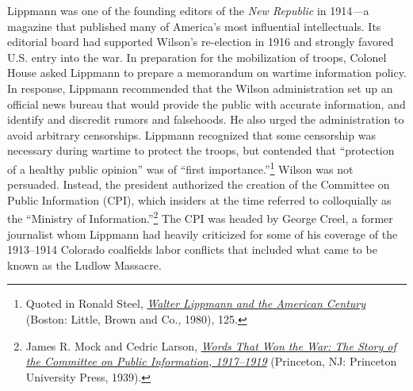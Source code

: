 \documentclass[openany,nobib,nohyper]{tufte-book}
\begin{document}
Lippmann was one of the founding editors of the \emph{New Republic} in
1914\emph{---}a magazine that published many of America's most
influential intellectuals. Its editorial board had supported Wilson's
re-election in 1916 and strongly favored U.S. entry into the war. In
preparation for the mobilization of troops, Colonel House asked Lippmann
to prepare a memorandum on wartime information policy. In response,
Lippmann recommended that the Wilson administration set up an official
news bureau that would provide the public with accurate information, and
identify and discredit rumors and falsehoods. He also urged the
administration to avoid arbitrary censorships. Lippmann recognized that
some censorship was necessary during wartime to protect the troops, but
contended that ``protection of a healthy public opinion'' was of ``first
importance.''\footnote{Quoted in Ronald Steel,
  \emph{\href{http://www.worldcat.org/oclc/1087969028}{Walter Lippmann
  and the American Century}} (Boston: Little, Brown and Co., 1980), 125.} Wilson was not
persuaded. Instead, the president authorized the creation of the
Committee on Public Information (CPI), which insiders at the time
referred to colloquially as the ``Ministry of
Information.''\footnote{James R. Mock and Cedric Larson,
  \emph{\href{http://www.worldcat.org/oclc/57518482}{Words That Won the
  War: The Story of the Committee on Public Information, 1917--1919}}
  (Princeton, NJ: Princeton University Press, 1939).} The CPI was headed
by George Creel, a former journalist whom Lippmann had heavily
criticized for some of his coverage of the 1913--1914 Colorado
coalfields labor conflicts that included what came to be known as the
Ludlow Massacre.

\enlargethispage{\baselineskip}
\end{document}
